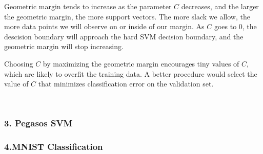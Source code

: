 \documentclass[10pt]{article}
\begin{document}
Geometric margin tends to increase as the parameter $C$ decreases, and the larger the geometric margin, the more support vectors.
The more slack we allow, the more data points we will observe on or inside of our margin. 
As $C$ goes to 0, the descision boundary will approach the hard SVM decision boundary, and the geometric margin will stop increasing.

Choosing $C$ by maximizing the geometric margin encourages tiny values of $C$, which are likely to overfit the training data.
A better procedure would select the value of $C$ that minimizes classification error on the validation set.



\begin{table}
\centering
{}
\begin{tabular}{c c|c|c|c|c|c}
\end{tabular}
\end{table}

\begin{table}
\centering
\begin{tabular}{llllll}
\end{tabular}
\end{table}

\subsubsection*{3. Pegasos SVM}

\subsubsection*{4.MNIST Classification}

\begin{table}[ht]
\centering
{}
\begin{tabular}{lrrrr}
\end{tabular}
\end{table}
\end{document}
